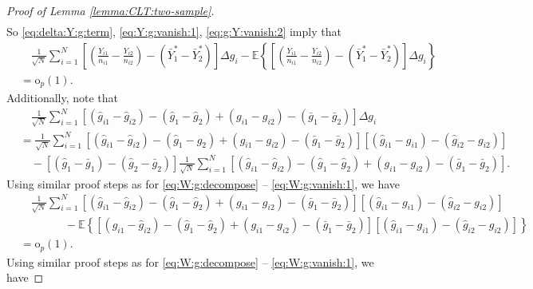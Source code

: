\documentclass[12pt,letterpaper]{article}
\begin{document}
\begin{proof}[Proof of Lemma \ref{lemma:CLT:two-sample}]
\begin{equation}
\begin{array}{rl}
\end{array}
\end{equation}
So \eqref{eq:delta:Y:g:term}, \eqref{eq:Y:g:vanish:1}, \eqref{eq:g:Y:vanish:2} imply that  
\begin{equation}\label{eq:delta:Y:g:equiv:asymptotics}
\begin{array}{rl}
    &\quad\displaystyle\frac{1}{\sqrt{N}}\sum_{i=1}^N\left[\left(\frac{Y_{i1}}{n_{i1}}-\frac{Y_{i2}}{n_{i2}}\right)-(\bar{Y}_1^*-\bar{Y}_2^*)\right]\Delta g_i-\mathbb{E}\left\{\left[\left(\frac{Y_{i1}}{n_{i1}}-\frac{Y_{i2}}{n_{i2}}\right)-(\bar{Y}_1^*-\bar{Y}_2^*)\right]\Delta g_i\right\}\\
    &\displaystyle=\mathrm{o}_p(1).
\end{array}
\end{equation}
Additionally, note that 
\begin{equation}\label{eq:delta:g:g:term}
\begin{array}{rl}
&\quad\displaystyle\frac{1}{\sqrt{N}}\sum_{i=1}^N[(\hat{g}_{i1}-\hat{g}_{i2})-(\hat{g}_1-\hat{g}_2)+(g_{i1}-g_{i2})-(\bar{g}_1-\bar{g}_2)]\Delta g_i\\
&\displaystyle=\frac{1}{\sqrt{N}}\sum_{i=1}^N[(\hat{g}_{i1}-\hat{g}_{i2})-(\hat{g}_1-\hat{g}_2)+(g_{i1}-g_{i2})-(\bar{g}_1-\bar{g}_2)][(\hat{g}_{i1}-g_{i1})-(\hat{g}_{i2}-g_{i2})]\\
&\quad\displaystyle-[(\hat{g}_1-\bar{g}_1)-(\hat{g}_2-\bar{g}_2)]\frac{1}{\sqrt{N}}\sum_{i=1}^N[(\hat{g}_{i1}-\hat{g}_{i2})-(\hat{g}_1-\hat{g}_2)+(g_{i1}-g_{i2})-(\bar{g}_1-\bar{g}_2)].
\end{array}
\end{equation}
Using similar proof steps as for \eqref{eq:W:g:decompose} -- \eqref{eq:W:g:vanish:1}, we have
\begin{equation}\label{eq:g:g:vanish:1}
\begin{array}{rl}
&\quad\displaystyle\frac{1}{\sqrt{N}}\sum_{i=1}^N[(\hat{g}_{i1}-\hat{g}_{i2})-(\hat{g}_1-\hat{g}_2)+(g_{i1}-g_{i2})-(\bar{g}_1-\bar{g}_2)][(\hat{g}_{i1}-g_{i1})-(\hat{g}_{i2}-g_{i2})]\\
&\displaystyle\quad\quad\quad\quad-\mathbb{E}\left\{[(\hat{g}_{i1}-\hat{g}_{i2})-(\hat{g}_1-\hat{g}_2)+(g_{i1}-g_{i2})-(\bar{g}_1-\bar{g}_2)][(\hat{g}_{i1}-g_{i1})-(\hat{g}_{i2}-g_{i2})]\right\}\\
&=\mathrm{o}_p(1).
\end{array}
\end{equation}
Using similar proof steps as for \eqref{eq:W:g:decompose} -- \eqref{eq:W:g:vanish:1}, we have 

\end{proof}
\end{document}
